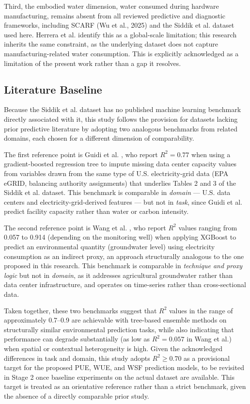 \documentclass[conference]{IEEEtran}
\begin{document}
Third, the embodied water dimension, water consumed during hardware manufacturing, remains absent from all reviewed predictive and diagnostic frameworks, including SCARF (Wu et al., 2025) and the Siddik et al. \cite{Siddik2021} dataset used here. Herrera et al. \cite{Herrera2025} identify this as a global-scale limitation; this research inherits the same constraint, as the underlying dataset does not capture manufacturing-related water consumption. This is explicitly acknowledged as a limitation of the present work rather than a gap it resolves.

\subsection{Literature Baseline}

Because the Siddik et al. \cite{Siddik2021} dataset has no published machine learning benchmark directly associated with it, this study follows the provision for datasets lacking prior predictive literature by adopting two analogous benchmarks from related domains, each chosen for a different dimension of comparability.

The first reference point is Guidi et al. \cite{Guidi2024}, who report $R^2 = 0.77$ when using a gradient-boosted regression tree to impute missing data center capacity values from variables drawn from the same type of U.S. electricity-grid data (EPA eGRID, balancing authority assignments) that underlies Tables 2 and 3 of the Siddik et al. dataset. This benchmark is comparable in \textit{domain} --- U.S. data centers and electricity-grid-derived features --- but not in \textit{task}, since Guidi et al. predict facility capacity rather than water or carbon intensity.

The second reference point is Wang et al. \cite{Wang2025XGBoost}, who report $R^2$ values ranging from 0.057 to 0.914 (depending on the monitoring well) when applying XGBoost to predict an environmental quantity (groundwater level) using electricity consumption as an indirect proxy, an approach structurally analogous to the one proposed in this research. This benchmark is comparable in \textit{technique and proxy logic} but not in \textit{domain}, as it addresses agricultural groundwater rather than data center infrastructure, and operates on time-series rather than cross-sectional data.

Taken together, these two benchmarks suggest that $R^2$ values in the range of approximately 0.7--0.9 are achievable with tree-based ensemble methods on structurally similar environmental prediction tasks, while also indicating that performance can degrade substantially (as low as $R^2 = 0.057$ in Wang et al.) when spatial or contextual heterogeneity is high. Given the acknowledged differences in task and domain, this study adopts $R^2 \geq 0.70$ as a provisional target for the proposed PUE, WUE, and WSF prediction models, to be revisited in Stage 2 once baseline experiments on the actual dataset are available. This target is treated as an orientative reference rather than a strict benchmark, given the absence of a directly comparable prior study.
\end{document}
